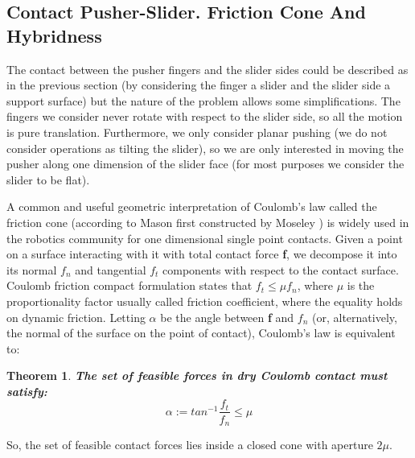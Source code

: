 \documentclass[12,twoside]{TFG-GM}
\newtheorem{theorem}{Theorem}[section]
\theoremstyle{definition}
\theoremstyle{remark}
\begin{document}
\subsection{Contact Pusher-Slider. Friction Cone And Hybridness}
\label{subsec:frictioncone}
The contact between the pusher fingers and the slider sides could be described as in the previous section (by considering the finger a slider and the slider side a support surface) but the nature of the problem allows some simplifications. The fingers we consider never rotate with respect to the slider side, so all the motion is pure translation. Furthermore, we only consider planar pushing (we do not consider operations as tilting the slider), so we are only interested in moving the pusher along one dimension of the slider face (for most purposes we consider the slider to be flat).

A common and useful geometric interpretation of Coulomb's law called the friction cone (according to Mason first constructed by Moseley \cite{moseley}) is widely used in the robotics community for one dimensional single point contacts. Given a point on a surface interacting with it with total contact force \textbf{f}, we decompose it into its normal $f_n$ and tangential $f_t$ components with respect to the contact surface. Coulomb friction compact formulation states that $f_t \leq \mu f_n$, where $\mu$ is the proportionality factor usually called friction coefficient, where the equality holds on dynamic friction. Letting $\alpha$ be the angle between \textbf{f} and $f_n$ (or, alternatively, the normal of the surface on the point of contact), Coulomb's law is equivalent to:

\begin{theorem} \label{th:friction_cone} \textbf{The set of feasible forces in dry Coulomb contact must satisfy:}
$$\alpha := tan^{-1} \frac{f_t}{f_n} \leq \mu$$
\end{theorem}

So, the set of feasible contact forces lies inside a closed cone with aperture $2\mu$.
\end{document}
